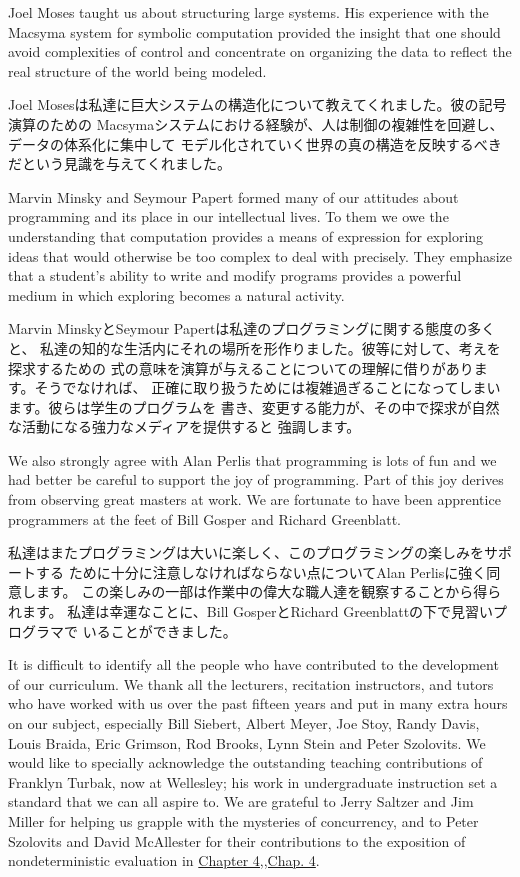 \documentclass[oneside]{book}
\newcommand{\link}[1]{\hyperref[#1]{#1}}
\begin{document}
Joel Moses taught us about structuring large systems.  His experience with the
Macsyma system for symbolic computation provided the insight that one should
avoid complexities of control and concentrate on organizing the data to reflect
the real structure of the world being modeled.

Joel Mosesは私達に巨大システムの構造化について教えてくれました。彼の記号演算のための
Macsymaシステムにおける経験が、人は制御の複雑性を回避し、データの体系化に集中して
モデル化されていく世界の真の構造を反映するべきだという見識を与えてくれました。

Marvin Minsky and Seymour Papert formed many of our attitudes about programming
and its place in our intellectual lives.  To them we owe the understanding that
computation provides a means of expression for exploring ideas that would
otherwise be too complex to deal with precisely.  They emphasize that a
student's ability to write and modify programs provides a powerful medium in
which exploring becomes a natural activity.

Marvin MinskyとSeymour Papertは私達のプログラミングに関する態度の多くと、
私達の知的な生活内にそれの場所を形作りました。彼等に対して、考えを探求するための
式の意味を演算が与えることについての理解に借りがあります。そうでなければ、
正確に取り扱うためには複雑過ぎることになってしまいます。彼らは学生のプログラムを
書き、変更する能力が、その中で探求が自然な活動になる強力なメディアを提供すると
強調します。

We also strongly agree with Alan Perlis that programming is lots of fun and we
had better be careful to support the joy of programming.  Part of this joy
derives from observing great masters at work.  We are fortunate to have been
apprentice programmers at the feet of Bill Gosper and Richard Greenblatt.

私達はまたプログラミングは大いに楽しく、このプログラミングの楽しみをサポートする
ために十分に注意しなければならない点についてAlan Perlisに強く同意します。
この楽しみの一部は作業中の偉大な職人達を観察することから得られます。
私達は幸運なことに、Bill GosperとRichard Greenblattの下で見習いプログラマで
いることができました。

It is difficult to identify all the people who have contributed to the
development of our curriculum.  We thank all the lecturers, recitation
instructors, and tutors who have worked with us over the past fifteen years and
put in many extra hours on our subject, especially Bill Siebert, Albert Meyer,
Joe Stoy, Randy Davis, Louis Braida, Eric Grimson, Rod Brooks, Lynn Stein and
Peter Szolovits.  We would like to specially acknowledge the outstanding
teaching contributions of Franklyn Turbak, now at Wellesley; his work in
undergraduate instruction set a standard that we can all aspire to.  We are
grateful to Jerry Saltzer and Jim Miller for helping us grapple with the
mysteries of concurrency, and to Peter Szolovits and David McAllester for their
contributions to the exposition of nondeterministic evaluation in \link{Chapter
4,,Chap. 4}.
\end{document}

